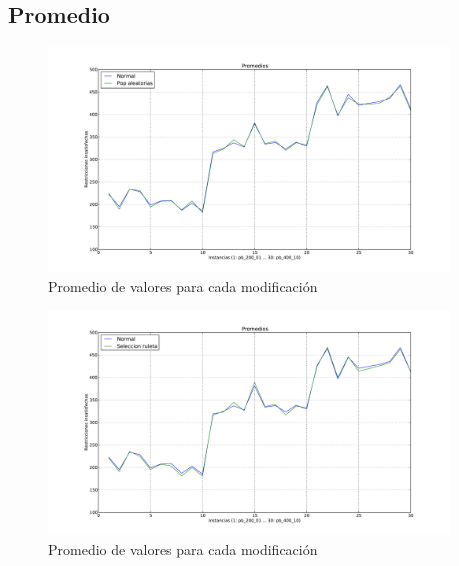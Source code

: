 \subsection{Promedio}

\begin{figure}[h!]
\begin{center}
\includegraphics[width=0.95\textwidth]{img/prom-1.pdf}
\end{center}
\caption{Promedio de valores para cada modificación}
\label{fig:prom-1}
\end{figure}

\begin{figure}[h!]
\begin{center}
\includegraphics[width=0.95\textwidth]{img/prom-2.pdf}
\end{center}
\caption{Promedio de valores para cada modificación}
\label{fig:prom-2}
\end{figure}

